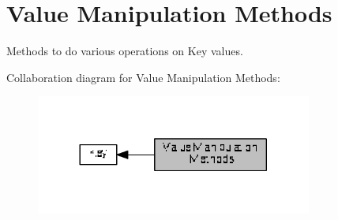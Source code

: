 \hypertarget{group__keyvalue}{}\section{Value Manipulation Methods}
\label{group__keyvalue}


Methods to do various operations on Key values.  


Collaboration diagram for Value Manipulation Methods\+:
\nopagebreak
\begin{figure}[H]
\begin{center}
\leavevmode
\includegraphics[width=257pt]{group__keyvalue}
\end{center}
\end{figure}

